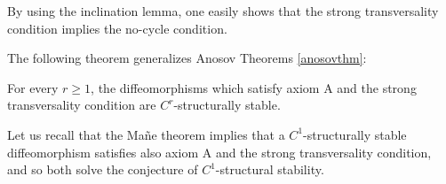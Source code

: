 \documentclass[11pt,openany,leqno]{article}
\begin{document}
\begin{rema} By using the inclination lemma, one easily shows that the strong transversality condition implies the no-cycle condition.
\end{rema}

 
The following theorem generalizes Anosov Theorems \ref{anosovthm}:

\begin{thm} \label{SSTRob}
For every $r\ge 1$, the diffeomorphisms which satisfy axiom A and the strong transversality condition are $C^r$-structurally stable.\end{thm}
Let us recall that the Ma\~ne theorem \cite{Ma88} implies that a $C^1$-structurally stable diffeomorphism satisfies also  axiom A and the strong transversality condition, and so both solve the conjecture   of $C^1$-structural stability. 
\end{document}
